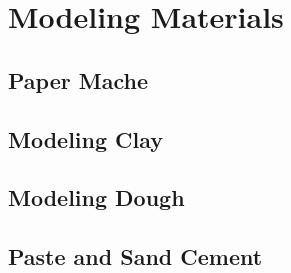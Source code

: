 \chapter{Modeling Materials}


\section{Paper Mache} %


\section{Modeling Clay}


\section{Modeling Dough} %


\section{Paste and Sand Cement}


